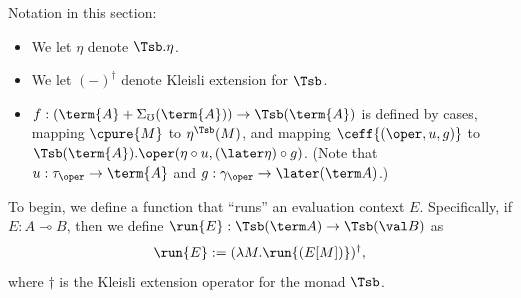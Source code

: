 Notation in this section:
%
\begin{itemize}
    \item We let $\eta$ denote $\Tsb.\eta$.
    \item We let $(-)^\dag$ denote Kleisli extension for $\Tsb$.
    \item $f : (\term{A} + \Sigma_\mho(\term{A})) \to \Tsb(\term{A})$ is defined by
    cases, mapping $\cpure{M}$ to $\eta^{\Tsb}(M)$, and mapping $\ceff{(\oper, u, g)}$ 
    to $\Tsb(\term{A}).\oper(\eta \circ u, (\later \eta) \circ g)$.
    (Note that $u : \tau_\oper \to \term{A}$ and $g : \gamma_\oper \to \later (\term A)$.)
\end{itemize}

To begin, we define a function that ``runs'' an evaluation context $E$.
Specifically, if $E : A \multimap B$, then we define $\run{E} : \Tsb(\term A)
\to \Tsb(\val B)$ as
%
\[ \run{E} := (\lambda M. \run{(E[M])})^\dag, \]
%
where $\dag$ is the Kleisli extension operator for the monad $\Tsb$.

